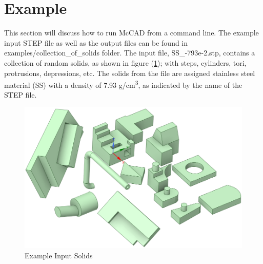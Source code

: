 \documentclass[12pt, a4paper, titlepage]{article}
\begin{document}
\section{Example} \label{sec:Example}
This section will discuss how to run McCAD from a command line. The example input STEP file as well as the output files can be found in examples/collection\_of\_solids folder. The input file, SS\_-793e-2.stp, contains a collection of random solids, as shown in figure (\ref{fig:ExampleSolids}); with steps, cylinders, tori, protrusions, depressions, etc. The solids from the file are assigned stainless steel material (SS) with a density of 7.93 g/cm\textsuperscript{3}, as indicated by the name of the STEP file.
\begin{figure}[h!]
	\centering
	\includegraphics[scale=0.42]{figures/InputSolids.png}
	\caption{Example Input Solids}
	\label{fig:ExampleSolids}
\end{figure}
\end{document}
